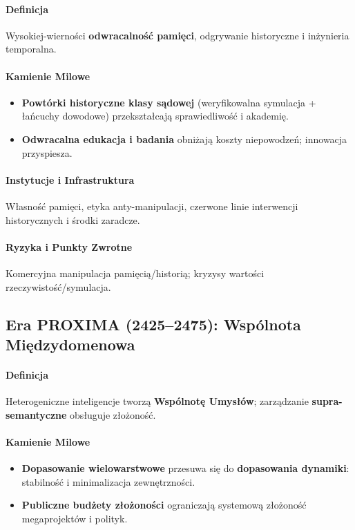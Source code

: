 \documentclass[11pt]{article}
\begin{document}
\paragraph{Definicja} Wysokiej-wierności \textbf{odwracalność pamięci}, odgrywanie historyczne i inżynieria temporalna.

\paragraph{Kamienie Milowe}
\begin{itemize}[noitemsep]
  \item \textbf{Powtórki historyczne klasy sądowej} (weryfikowalna symulacja + łańcuchy dowodowe) przekształcają sprawiedliwość i akademię.
  \item \textbf{Odwracalna edukacja i badania} obniżają koszty niepowodzeń; innowacja przyspiesza.
\end{itemize}

\paragraph{Instytucje i Infrastruktura} Własność pamięci, etyka anty-manipulacji, czerwone linie interwencji historycznych i środki zaradcze.

\paragraph{Ryzyka i Punkty Zwrotne} Komercyjna manipulacja pamięcią/historią; kryzysy wartości rzeczywistość/symulacja.

\subsection{Era PROXIMA (2425–2475): Wspólnota Międzydomenowa}
\paragraph{Definicja} Heterogeniczne inteligencje tworzą \textbf{Wspólnotę Umysłów}; zarządzanie \textbf{supra-semantyczne} obsługuje złożoność.

\paragraph{Kamienie Milowe}
\begin{itemize}[noitemsep]
  \item \textbf{Dopasowanie wielowarstwowe} przesuwa się do \textbf{dopasowania dynamiki}: stabilność i minimalizacja zewnętrzności.
  \item \textbf{Publiczne budżety złożoności} ograniczają systemową złożoność megaprojektów i polityk.
\end{itemize}
\end{document}
